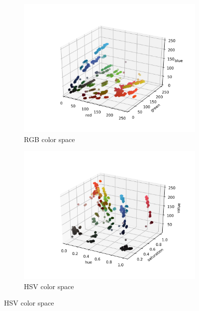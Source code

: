 \documentclass[12pt,a4paper]{article}
\begin{document}
	\begin{center}
		\begin{figure}[H]
			\begin{subfigure}{.5\linewidth}
				\includegraphics[width=\linewidth]{images/rgb.png}
				\caption{RGB color space}
			\end{subfigure}
			\begin{subfigure}{.5\linewidth}
				\includegraphics[width=\linewidth]{images/hsv.png}
				\caption{HSV color space}
			\end{subfigure}
		\end{figure}
	\end{center}
\end{document}
